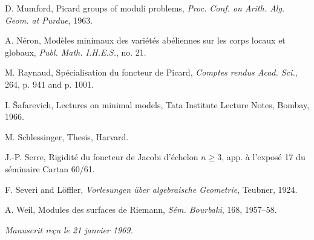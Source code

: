 \documentclass[10pt]{article}
\begin{document}
\begin{description}[leftmargin=2.4em,labelwidth=2.1em,itemsep=0.05em]
\item[{[M$_3$]}] D. Mumford, Picard groups of moduli problems, \emph{Proc. Conf. on Arith. Alg. Geom. at Purdue}, 1963.
\item[{[N]}] A. Néron, Modèles minimaux des variétés abéliennes sur les corps locaux et globaux, \emph{Publ. Math. I.H.E.S.}, no. 21.
\item[{[R]}] M. Raynaud, Spécialisation du foncteur de Picard, \emph{Comptes rendus Acad. Sci.}, 264, p. 941 and p. 1001.
\item[{[\v{S}]}] I. \v{S}afarevich, Lectures on minimal models, Tata Institute Lecture Notes, Bombay, 1966.
\item[{[Sc]}] M. Schlessinger, Thesis, Harvard.
\item[{[S]}] J.-P. Serre, Rigidité du foncteur de Jacobi d'échelon $n\geq3$, app. à l'exposé 17 du séminaire Cartan 60/61.
\item[{[Se]}] F. Severi and Löffler, \emph{Vorlesungen über algebraische Geometrie}, Teubner, 1924.
\item[{[W]}] A. Weil, Modules des surfaces de Riemann, \emph{Sém. Bourbaki}, 168, 1957--58.
\end{description}

\begin{flushright}
\emph{Manuscrit reçu le 21 janvier 1969.}
\end{flushright}
\end{document}
